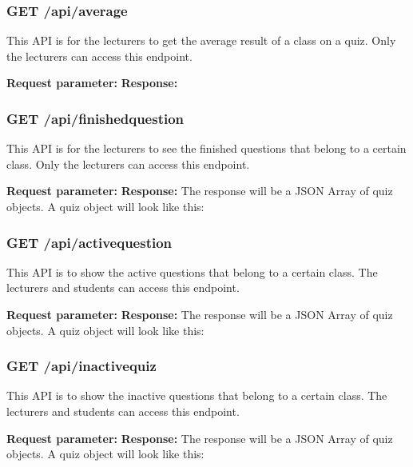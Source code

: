 \documentclass[a4paper, 11pt,openany]{book} %
\begin{document}
\subsubsection{GET /api/average}
This API is for the lecturers to get the average result of a class on a quiz. Only the lecturers can access this endpoint. \par
\textbf{Request parameter:}
\textbf{Response:}

\subsubsection{GET /api/finishedquestion}
This API is for the lecturers to see the finished questions that belong to a certain class. Only the lecturers can access this endpoint. \par
\textbf{Request parameter:}
\textbf{Response:}
The response will be a JSON Array of quiz objects. A quiz object will look like this:

\subsubsection{GET /api/activequestion}
This API is to show the active questions that belong to a certain class. The lecturers and students can access this endpoint. \par
\textbf{Request parameter:}
\textbf{Response:}
The response will be a JSON Array of quiz objects. A quiz object will look like this:

\subsubsection{GET /api/inactivequiz}
This API is to show the inactive questions that belong to a certain class. The lecturers and students can access this endpoint. \par
\textbf{Request parameter:}
\textbf{Response:}
The response will be a JSON Array of quiz objects. A quiz object will look like this:
\end{document}
